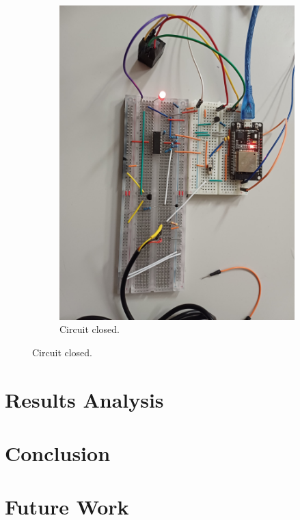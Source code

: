 \documentclass[12pt]{article}
\begin{document}
\begin{figure}[H]
\begin{subfigure}{0.45\textwidth}
                \includegraphics*[scale = 0.05]{images/RelayOn.jpeg}
                \caption{Circuit closed.}
                \label{fig:RelayClosed}
            \end{subfigure}
        \end{figure}

\section{Results Analysis}

    



\section{Conclusion}

    
\section{Future Work}
    
\end{document}

